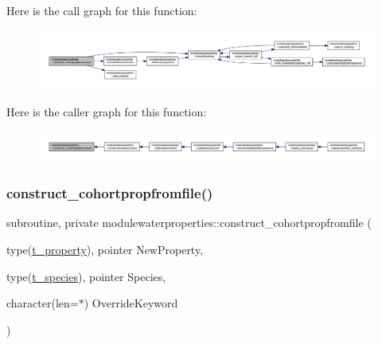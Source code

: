 Here is the call graph for this function\+:\nopagebreak
\begin{figure}[H]
\begin{center}
\leavevmode
\includegraphics[width=350pt]{namespacemodulewaterproperties_ae1c5c0deae03ce719a2b777bc86fb00f_cgraph}
\end{center}
\end{figure}
Here is the caller graph for this function\+:\nopagebreak
\begin{figure}[H]
\begin{center}
\leavevmode
\includegraphics[width=350pt]{namespacemodulewaterproperties_ae1c5c0deae03ce719a2b777bc86fb00f_icgraph}
\end{center}
\end{figure}
\mbox{\label{namespacemodulewaterproperties_ad9060a1bd0766835e26c1961f52d84a0}} 
\subsubsection{\texorpdfstring{construct\+\_\+cohortpropfromfile()}{construct\_cohortpropfromfile()}}
{\footnotesize\ttfamily subroutine, private modulewaterproperties\+::construct\+\_\+cohortpropfromfile (\begin{DoxyParamCaption}\item[{type(\mbox{\hyperlink{structmodulewaterproperties_1_1t__property}{t\+\_\+property}}), pointer}]{New\+Property,  }\item[{type(\mbox{\hyperlink{structmodulewaterproperties_1_1t__species}{t\+\_\+species}}), pointer}]{Species,  }\item[{character(len=$\ast$)}]{Override\+Keyword }\end{DoxyParamCaption})\hspace{0.3cm}{\ttfamily [private]}}

